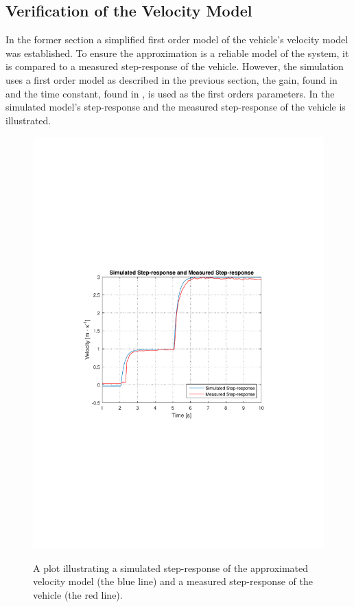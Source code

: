 \subsection{Verification of the Velocity Model}
In the former section a simplified first order model of the vehicle's velocity model was established. To ensure the approximation is a reliable model of the system, it is compared to a measured step-response of the vehicle. However, the simulation uses a first order model as described in the previous section, the gain, found in  and the time constant, found in , is used as the first orders parameters. In  the simulated model's step-response and the measured step-response of the vehicle is illustrated. 
%
\begin{figure}[H]
  \centering
  {
    \includegraphics[width=1.4\textwidth]{figures/SimulationIRLsteprespons2.pdf}
  }
  \caption{A plot illustrating a simulated step-response of the approximated velocity model (the blue line) and a measured step-response of the vehicle (the red line).}
  \label{SimulationIRLsteprespons2}
\end{figure}\vspace{-5mm}
